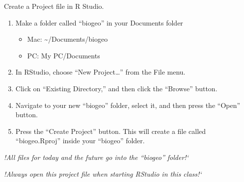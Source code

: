 \documentclass[t]{beamer}
\begin{document}
\begin{frame}[t]{Create a Project file in R Studio.}

\begin{enumerate}
\item Make a folder called “biogeo” in your Documents folder
\begin{itemize}
\item Mac: \textasciitilde/Documents/biogeo
\item PC: My PC/Documents

\end{itemize}

	\item In RStudio, choose “New Project…” from the File menu.
	
	\item Click on “Existing Directory,” and then click the “Browse” button. 
	
	\item Navigate to your new “biogeo” folder, select it, and then press the “Open” button.
	
	\item Press the “Create Project” button. This will create a file called “biogeo.Rproj” inside your “biogeo” folder.

\end{enumerate}
	
	\hangpara \textit{!All files for today and the future go into the “biogeo” folder!`}
	
	\hangpara \textit{!Always open this project file when starting RStudio in this class!`}
	
\end{frame}

%
%
\end{document}
